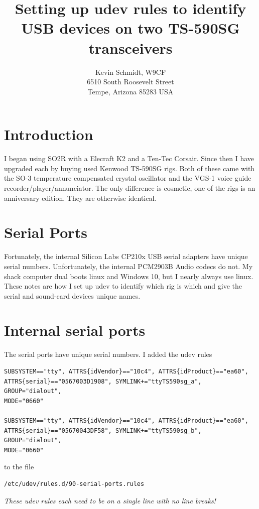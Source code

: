 \documentclass[12pt]{article}
\begin{document}
\title{
Setting up udev rules to identify USB devices on two TS-590SG transceivers
}
\author{
Kevin Schmidt, W9CF\\
6510 South Roosevelt Street\\
Tempe, Arizona 85283 USA\\
}
\date{}
\maketitle

\section{Introduction}
I began using SO2R with a Elecraft K2 and a Ten-Tec Corsair. Since then
I have upgraded each by buying used Kenwood TS-590SG rigs. Both of
these came with the SO-3 temperature compensated crystal oscillator
and the VGS-1 voice guide recorder/player/annunciator.
The only difference is cosmetic,
one of the rigs is an anniversary edition. They are otherwise identical.

\section{Serial Ports}
Fortunately, the internal Silicon Labs CP210x USB serial adapters have
unique serial numbers. Unfortunately, the internal PCM2903B Audio codecs
do not. My shack computer dual boots linux and Windows 10, but I nearly
always use linux. These notes are how I set up udev to identify which
rig is which and give the serial and sound-card devices unique names.

\section{Internal serial ports}
The serial ports have unique serial numbers. I added the udev rules
\begin{verbatim}
SUBSYSTEM=="tty", ATTRS{idVendor}=="10c4", ATTRS{idProduct}=="ea60",
ATTRS{serial}=="0567003D1908", SYMLINK+="ttyTS590sg_a", GROUP="dialout",
MODE="0660"

SUBSYSTEM=="tty", ATTRS{idVendor}=="10c4", ATTRS{idProduct}=="ea60",
ATTRS{serial}=="05670043DF58", SYMLINK+="ttyTS590sg_b", GROUP="dialout",
MODE="0660"
\end{verbatim}
to the file
\begin{verbatim}
/etc/udev/rules.d/90-serial-ports.rules
\end{verbatim}
{\em These udev rules each need to be on a single line with no line breaks!}
\end{document}
